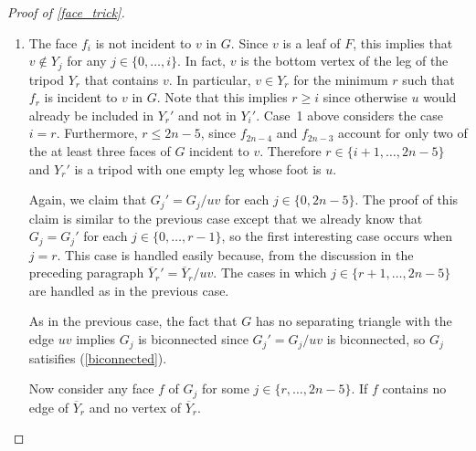 \documentclass{patmorin}
\begin{document}
\begin{proof}[Proof of \cref{face_trick}]
\begin{enumerate}
    Since $G_j'=G_j/uv$, there is an injective function from the faces of $G_j'$ onto the faces of $G_j$.  Therefore, for any face $f\not\in\{f_{2n-3},f_{2n-4}\}$ of $G_j$ there is a corresponding face $f'$ of $G_j'$.  It is straightforward to verify that $J_\mathcal{F}(f)=J_\mathcal{F'}(f')$ and therefore $f$ satisfies (\ref{three_faces}) since $f'$ satisfies (\ref{three_faces}).

    \item The face $f_i$ is not incident to $v$ in $G$.  Since $v$ is a leaf of $F$, this implies that $v\not\in Y_j$ for any $j\in\{0,\ldots,i\}$.  In fact, $v$ is the bottom vertex of the leg of the tripod $Y_r$ that contains $v$.  In particular, $v\in Y_r$ for the minimum $r$ such that $f_r$ is incident to $v$ in $G$.  Note that this implies $r\ge i$ since otherwise $u$ would already be included in $Y_r'$ and not in $Y_i'$. Case~1 above considers the case $i=r$.  Furthermore, $r\le 2n-5$, since  $f_{2n-4}$ and $f_{2n-3}$ account for only two of the at least three faces of $G$ incident to $v$.  Therefore $r\in\{i+1,\ldots,2n-5\}$ and $Y_r'$ is a tripod with one empty leg whose foot is $u$.

    Again, we claim that $G_j'=G_j/uv$ for each $j\in\{0,2n-5\}$.  The proof of this claim is similar to the previous case except that we already know that $G_j=G_j'$ for each $j\in\{0,\ldots,r-1\}$, so the first interesting case occurs when $j=r$. This case is handled easily because, from the discussion in the preceding paragraph $\overline{Y}_r'=\overline{Y}_r/uv$.  The cases in which $j\in\{r+1,\ldots,2n-5\}$ are handled as in the previous case.

    As in the previous case, the fact that $G$ has no separating triangle with the edge $uv$ implies $G_j$ is biconnected since $G_j'=G_j/uv$ is biconnected, so $G_j$ satisifies (\ref{biconnected}).




    Now consider any face $f$ of $G_j$ for some $j\in\{r,\ldots,2n-5\}$.  If $f$ contains no edge of $\overline{Y}_r$ and no vertex of $\overline{Y}_r$.


\end{enumerate}
\end{proof}
\end{document}
